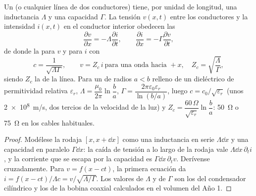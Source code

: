 \begin{proposition}\label{prop:b2:dispersion-wave-packets:coax}
Un  (o cualquier línea de dos conductores) tiene, por unidad
de longitud, una inductancia $\Lambda$ y una capacidad $\Gamma$. La tensión
$v(x, t)$ entre los conductores y la intensidad $i(x, t)$ en el conductor
interior obedecen las \emph{}
\[
\frac{\partial v}{\partial x} = -\Lambda\frac{\partial i}{\partial t} , \qquad
\frac{\partial i}{\partial x} = -\Gamma\frac{\partial v}{\partial t} ,
\]
de donde la  para $v$ y para $i$ con
\[
c = \frac1{\sqrt{\Lambda\Gamma}} , \qquad
v = Z_c\,i \ \text{para una onda hacia } +x, \quad Z_c = \sqrt{\frac\Lambda\Gamma} ,
\]
siendo $Z_c$ la \emph{} de la línea. Para un
 de radios $a < b$ relleno de un dieléctrico de permitividad
relativa $\varepsilon_r$, $\Lambda = \dfrac{\mu_0}{2\pi}\ln\dfrac ba$, $\Gamma =
\dfrac{2\pi\varepsilon_0\varepsilon_r}{\ln(b/a)}$, luego $c = c_0/\sqrt{\varepsilon_r}$ (unos
\qty{2e8}{m/s}, dos tercios de la velocidad de la luz) y $Z_c = \dfrac{60\,\Omega}
{\sqrt{\varepsilon_r}}\ln\dfrac ba$: \qty{50}{\ohm} o \qty{75}{\ohm} en los cables habituales.
\end{proposition}

\begin{proof}
Modélese la rodaja $[x, x + \dd x]$ como una inductancia en serie $\Lambda\dd x$ y
una capacidad en paralelo $\Gamma\dd x$: la caída de tensión a lo largo de la
rodaja vale $\Lambda\dd x\,\partial_ti$, y la corriente que se escapa por la capacidad es $\Gamma\dd x
\,\partial_tv$. Derívense cruzadamente. Para $v = f(x - ct)$, la primera ecuación
da $i = f(x - ct)/\Lambda c = v/\sqrt{\Lambda/\Gamma}$. Los valores de $\Lambda$ y de
$\Gamma$ son los del condensador cilíndrico y los de la bobina coaxial
calculados en el volumen del Año 1.
\end{proof}

